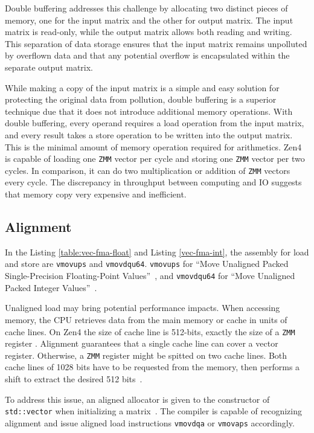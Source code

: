 \documentclass[logo,bsc,singlespacing,parskip]{infthesis}
\newcommand{\zmm}{\texttt{ZMM}}
\begin{document}
Double buffering addresses this challenge by allocating two distinct pieces of
memory, one for the input matrix and the other for output matrix. The input
matrix is read-only, while the output matrix allows both reading and writing.
This separation of data storage ensures that the input matrix remains unpolluted
by overflown data and that any potential overflow is encapsulated within the
separate output matrix. 

While making a copy of the input matrix is a simple and easy solution for
protecting the original data from pollution, double buffering is a superior
technique due that it does not introduce additional memory operations. With
double buffering, every operand requires a load operation from the input matrix,
and every result takes a store operation to be written into the output matrix.
This is the minimal amount of memory operation required for arithmetics. Zen4 is
capable of loading one \zmm{} vector per cycle and storing one \zmm{} vector per two
cycles. In comparison, it can do two multiplication or addition of \zmm{}
vectors every cycle. The discrepancy in throughput between computing and IO
suggests that memory copy very expensive and inefficient. 

\subsection{Alignment}
In the Listing \ref{table:vec-fma-float} and Listing \ref{vec-fma-int}, the
assembly for load and store are \texttt{vmovups} and \texttt{vmovdqu64}. 
\texttt{vmovups} for
``Move Unaligned Packed Single-Precision Floating-Point Values''~\cite{vmovups},
and \texttt{vmovdqu64} for 
``Move Unaligned Packed Integer Values''~\cite{vmovdqu64}. 

Unaligned load may bring potential performance impacts. When accessing memory,
the CPU retrieves data from the main memory or cache in units of cache lines. On
Zen4 the size of cache line is 512-bits, exactly the size of a \zmm{} register
\cite{AMDManual}. Alignment guarantees that a single cache line can cover a
vector register. Otherwise, a \zmm{} register might be spitted on two cache lines.
Both cache lines of 1028 bits have to be requested from the memory, then
performs a shift to extract the desired 512 bits~\cite{Unaligned}.  

To address this issue, an aligned allocator is given to the constructor of
\texttt{std::vector} when initializing a matrix~\cite{FPL2}. 
 The compiler is capable of recognizing alignment
and issue aligned load instructions \texttt{vmovdqa} or \texttt{vmovaps}
accordingly. 
\end{document}
